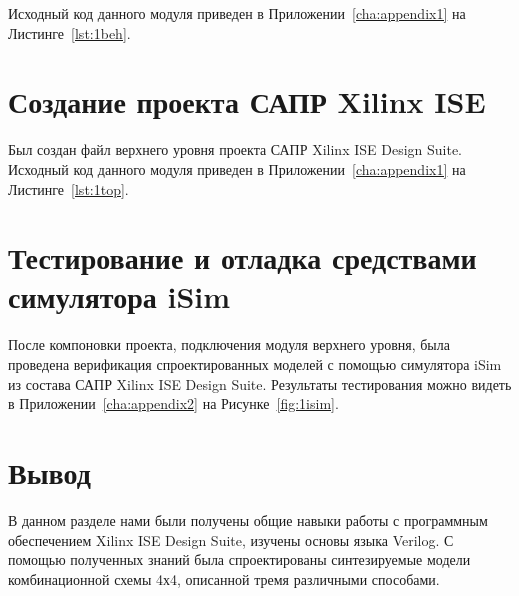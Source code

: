 Исходный код данного модуля приведен в Приложении~\ref{cha:appendix1} на Листинге~\ref{lst:1beh}.
%

\section{Создание проекта САПР Xilinx ISE}

Был создан файл верхнего уровня проекта САПР Xilinx ISE Design Suite.
Исходный код данного модуля приведен в Приложении~\ref{cha:appendix1} на Листинге~\ref{lst:1top}.
%


\section{Тестирование и отладка средствами симулятора iSim}
После компоновки проекта, подключения модуля верхнего уровня, была проведена верификация спроектированных моделей с помощью симулятора iSim из состава САПР Xilinx ISE Design Suite. Результаты тестирования можно видеть в Приложении~\ref{cha:appendix2} на Рисунке~\ref{fig:1isim}.


\section{Вывод}
В данном разделе нами были получены общие навыки работы с программным обеспечением Xilinx ISE Design Suite, изучены основы языка Verilog. С помощью полученных знаний была спроектированы синтезируемые модели комбинационной схемы 4х4, описанной тремя различными способами.

%
